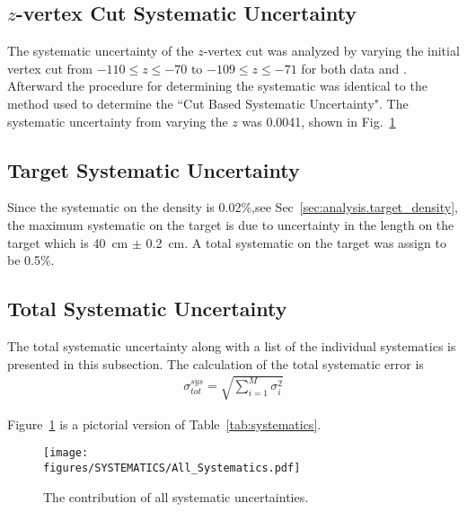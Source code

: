  					
 					\subsection{$z$-vertex Cut Systematic Uncertainty}
 					The systematic uncertainty of the $z$-vertex cut was analyzed by varying the initial vertex cut from $-110 \le z \le -70$ to $-109 \le z \le -71$ for both data and . Afterward the procedure for determining the systematic was identical to the method used to determine the ``Cut Based Systematic Uncertainty". The systematic uncertainty from varying the $z$ was 0.0041, shown in Fig.~\ref{fig:results.syserr}
 					
 					\subsection{Target Systematic Uncertainty}
 					Since the systematic on the density is 0.02\%,see Sec~\ref{sec:analysis.target_density}, the maximum systematic on the target is due to uncertainty in the length on the target which is 40~cm $\pm$ 0.2~cm. A total systematic on the target was assign to be 0.5\%. 
 					
 					\subsection{Total Systematic Uncertainty}
 					The total systematic uncertainty along with a list of the individual systematics is presented in this subsection. The calculation of the total systematic error is 
 					\begin{align}
 						\sigma^{sys}_{tot} = \sqrt{\sum_{i=1}^{M}\sigma_i^2}
 					\end{align}
 					
 					Figure~\ref{fig:results.syserr} is a pictorial version of Table~\ref{tab:systematics}.
 					\begin{figure}[h!]\begin{center}
 							\texttt{[image: \\figures/SYSTEMATICS/All\_Systematics.pdf]}
 							\caption[The contribution of all systematic uncertainties]{\label{fig:results.syserr}The contribution of all systematic uncertainties.}
 						\end{center}\end{figure} 